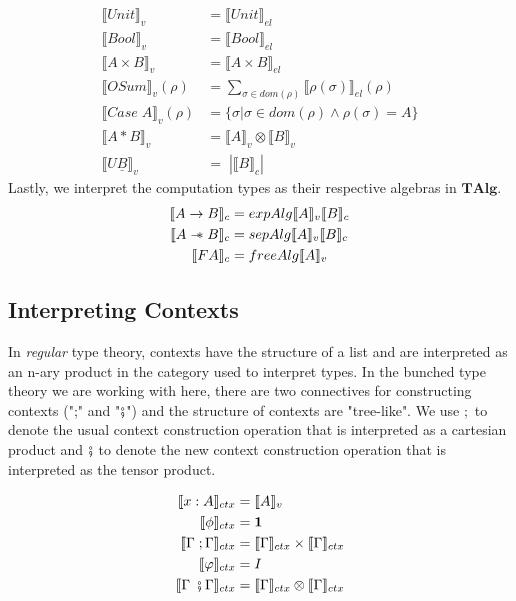 \documentclass{article}
\newcommand\sep{\mathrel{-\mkern-6mu*}}
\begin{document}
\begin{align*}
    \llbracket Unit \rrbracket_v &= \llbracket Unit \rrbracket_{el}\\
    \llbracket Bool \rrbracket_v &= \llbracket Bool \rrbracket_{el}\\
    \llbracket A \times B \rrbracket_v &= \llbracket A \times B \rrbracket_{el}\\
    \llbracket OSum \rrbracket_v (\rho)&= \sum_{\sigma \in dom(\rho)} \llbracket \rho(\sigma) \rrbracket_{el}(\rho)\\
    \llbracket Case \; A \rrbracket_v(\rho) &= \{ \sigma | \sigma \in dom(\rho) \land \rho(\sigma)= A \} \\
    \llbracket A * B \rrbracket_v &= \llbracket A \rrbracket_v \otimes \llbracket B \rrbracket_v \\
    \llbracket U  \underline{B} \rrbracket_v &= \;| \llbracket B \rrbracket_c |
\end{align*}
Lastly, we interpret the computation types as their respective algebras in $\mathbf{TAlg}$. 
\begin{align*}
    \llbracket A \rightarrow B \rrbracket_c &= expAlg\llbracket A \rrbracket_v \llbracket B \rrbracket_c\\
    \llbracket A \sep B \rrbracket_c &= sepAlg\llbracket A \rrbracket_v\llbracket B \rrbracket_c\\
    \llbracket F A \rrbracket_c &= freeAlg\llbracket A \rrbracket_v\\
\end{align*}
\subsection{Interpreting Contexts}
In \textit{regular} type theory, contexts have the structure of a list and are interpreted as an n-ary product in the category used to interpret types. In the bunched type theory we are working with here, there are two connectives for constructing contexts (";" and "$\fatsemi$") and the structure of contexts are "tree-like". We use $;$ to denote the usual context construction operation that is interpreted as a cartesian product and $\fatsemi$ to denote the new context construction operation that is interpreted as the tensor product.

\begin{align*}
    \llbracket x : A \rrbracket_{ctx} &= \llbracket A \rrbracket_v \\
    \llbracket \phi \rrbracket_{ctx} &= \mathbf{1} \\
    \llbracket \Gamma \;; \Gamma \rrbracket_{ctx} &=  \llbracket \Gamma \rrbracket_{ctx} \times \llbracket \Gamma \rrbracket_{ctx}\\
    \llbracket \varphi \rrbracket_{ctx} &= I \\
    \llbracket \Gamma \;\fatsemi \Gamma \rrbracket_{ctx} &=  \llbracket \Gamma \rrbracket_{ctx} \otimes \llbracket \Gamma \rrbracket_{ctx} \\
\end{align*}
\end{document}
